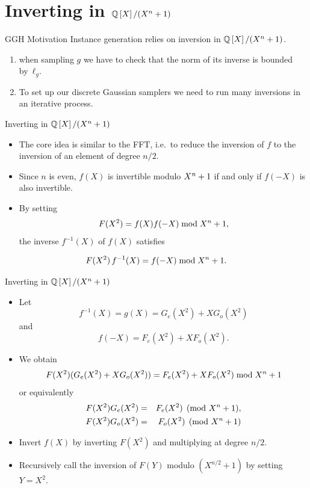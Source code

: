 \documentclass[presentation,smaller]{beamer}
\begin{document}
\section{Inverting in \(\Q[X]/(\cycf)\)}
\label{sec:orgheadline42}

\begin{frame}[label={sec:orgheadline35}]{GGH Motivation}
Instance generation relies on inversion in \(\Q[X]/(\cycf)\).

\begin{enumerate}
\item when sampling \(g\) we have to check that the norm of its inverse is bounded by \(ℓ_g\).
\item To set up our discrete Gaussian samplers we need to run many inversions in an iterative process.
\end{enumerate}
\end{frame}

\begin{frame}[label={sec:orgheadline36}]{Inverting in \(\Q[X]/(\cycf)\)}
\begin{itemize}
\item The core idea  is similar to the FFT, i.e. to reduce the inversion of \(f\) to the inversion of an element of degree \(n/2\).

\item Since \(n\) is even, \(f(X)\) is invertible modulo \(X^n+1\) if and only if \(f(-X)\) is also invertible.

\item By setting \[F(X^2) = f(X)f(-X) \bmod{\ensuremath{X^n+1}},\] the inverse \(f^{-1}(X)\) of \(f(X)\) satisfies
\end{itemize}
\[F(X^2)\,f^{-1}(X) = f(-X) \bmod{\ensuremath{X^n+1}}.\]
\end{frame}

\begin{frame}[label={sec:orgheadline37}]{Inverting in \(\Q[X]/(\cycf)\)}
\begin{itemize}
\item Let \[f^{-1}(X) = g(X) = G_e(X^2) + X G_o(X^2)\] and \[f(-X) = F_e(X^2) + X F_o(X^2).\]

\item We obtain \[F(X^2)(G_e(X^2) + X G_o(X^2)) = F_e(X^2) + X F_o(X^2) \bmod{\ensuremath{X^n+1}}\] or equivalently
\begin{eqnarray*}
F(X^2) G_e(X^2) &=& F_e(X^2) \pmod{X^n+1},\\
F(X^2) G_o(X^2) &=& F_o(X^2) \pmod{X^n+1}
\end{eqnarray*}

\item Invert \(f(X)\) by inverting \(F(X^2)\) and multiplying at degree \(n/2\).
\item Recursively call the inversion of \(F(Y)\) modulo \((X^{n/2}+1)\) by setting \(Y=X^2\).
\end{itemize}
\end{frame}
\end{document}

